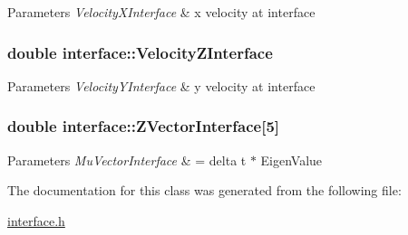\begin{DoxyParams}{Parameters}
{\em Velocity\+X\+Interface} & x velocity at interface \\
\hline
\end{DoxyParams}
\subsubsection[{\texorpdfstring{Velocity\+Z\+Interface}{VelocityZInterface}}]{\setlength{\rightskip}{0pt plus 5cm}double interface\+::\+Velocity\+Z\+Interface}\hypertarget{classinterface_a1f1cc4570519d23fc38414472d7721f9}{}\label{classinterface_a1f1cc4570519d23fc38414472d7721f9}

\begin{DoxyParams}{Parameters}
{\em Velocity\+Y\+Interface} & y velocity at interface \\
\hline
\end{DoxyParams}
\subsubsection[{\texorpdfstring{Z\+Vector\+Interface}{ZVectorInterface}}]{\setlength{\rightskip}{0pt plus 5cm}double interface\+::\+Z\+Vector\+Interface\mbox{[}5\mbox{]}}\hypertarget{classinterface_a32902e62056c2479ade3f78167f1522f}{}\label{classinterface_a32902e62056c2479ade3f78167f1522f}

\begin{DoxyParams}{Parameters}
{\em Mu\+Vector\+Interface} & = delta t $\ast$ Eigen\+Value \\
\hline
\end{DoxyParams}


The documentation for this class was generated from the following file\+:\begin{DoxyCompactItemize}
\item 
\hyperlink{interface_8h}{interface.\+h}\end{DoxyCompactItemize}

